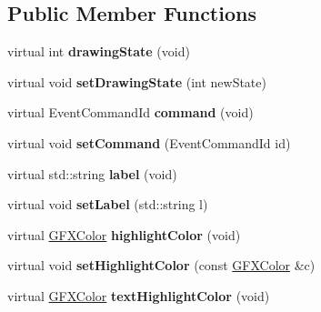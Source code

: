 \subsection*{Public Member Functions}
\begin{DoxyCompactItemize}
\item 
virtual int {\bfseries drawing\+State} (void)\hypertarget{classNewButton_ab46440456e7c6a5ad3361248ee72b1b2}{}\label{classNewButton_ab46440456e7c6a5ad3361248ee72b1b2}

\item 
virtual void {\bfseries set\+Drawing\+State} (int new\+State)\hypertarget{classNewButton_a2bfc60a2a063afdbab8d169c3cdf007a}{}\label{classNewButton_a2bfc60a2a063afdbab8d169c3cdf007a}

\item 
virtual Event\+Command\+Id {\bfseries command} (void)\hypertarget{classNewButton_a8547819e7b85a35ef15e208f88786b33}{}\label{classNewButton_a8547819e7b85a35ef15e208f88786b33}

\item 
virtual void {\bfseries set\+Command} (Event\+Command\+Id id)\hypertarget{classNewButton_acb304555d3cb27067643c2be518acb1f}{}\label{classNewButton_acb304555d3cb27067643c2be518acb1f}

\item 
virtual std\+::string {\bfseries label} (void)\hypertarget{classNewButton_a6228f413378ef867f827e826b78853c6}{}\label{classNewButton_a6228f413378ef867f827e826b78853c6}

\item 
virtual void {\bfseries set\+Label} (std\+::string l)\hypertarget{classNewButton_a6873fdc05e3304777870e67363c81d20}{}\label{classNewButton_a6873fdc05e3304777870e67363c81d20}

\item 
virtual \hyperlink{structGFXColor}{G\+F\+X\+Color} {\bfseries highlight\+Color} (void)\hypertarget{classNewButton_aad5e6516506a5f0ff23910496c67b566}{}\label{classNewButton_aad5e6516506a5f0ff23910496c67b566}

\item 
virtual void {\bfseries set\+Highlight\+Color} (const \hyperlink{structGFXColor}{G\+F\+X\+Color} \&c)\hypertarget{classNewButton_af19a1b52438251ad79e2ff8eb878df07}{}\label{classNewButton_af19a1b52438251ad79e2ff8eb878df07}

\item 
virtual \hyperlink{structGFXColor}{G\+F\+X\+Color} {\bfseries text\+Highlight\+Color} (void)\hypertarget{classNewButton_a8b4e7324cc79b0509eacc69af0778a4d}{}\label{classNewButton_a8b4e7324cc79b0509eacc69af0778a4d}


\end{DoxyCompactItemize}
